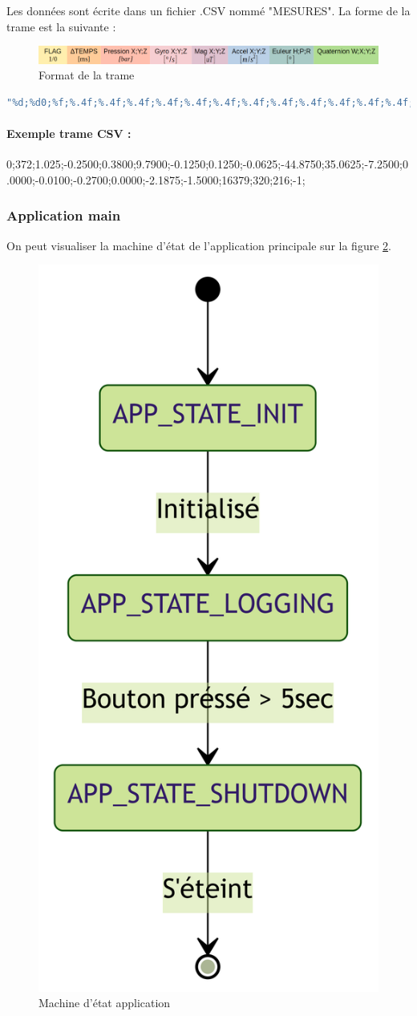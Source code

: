 {	Les données sont écrite dans un fichier .CSV nommé "MESURES". La forme de la trame est la suivante :
	
	\begin{figure}[h]
		\centering
		\includegraphics[width=1.1\textwidth]{Figures/Dev-SOFT/Trame}
		\caption{Format de la trame}
		\label{fig:trame}
	\end{figure}

	\begin{lstlisting}[frame=single, language=C, caption={Ecriture du buffer}, captionpos=b, breaklines=true]
"%d;%d0;%f;%.4f;%.4f;%.4f;%.4f;%.4f;%.4f;%.4f;%.4f;%.4f;%.4f;%.4f;%.4f;%.4f;%.4f;%.4f;%d;%d;%d;%d;"
	\end{lstlisting}
	
	\paragraph{Exemple trame CSV :} 
	0;372;1.025;-0.2500;0.3800;9.7900;-0.1250;0.1250;-0.0625;-44.8750;35.0625;-7.2500;0.0000;-0.0100;-0.2700;0.0000;-2.1875;-1.5000;16379;320;216;-1;

	
	\subsubsection{Application main}
	On peut visualiser la machine d'état de l'application principale sur la figure \ref{fig:stateapp}.
	\begin{figure}[h]
		\centering
		\includegraphics[width=0.28\linewidth]{Figures/Dev-SOFT/StateApp}
		\caption{Machine d'état application}
		\label{fig:stateapp}
	\end{figure}

}
